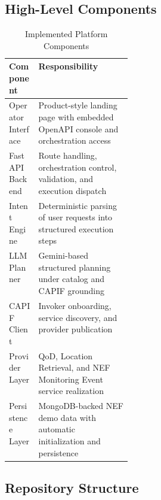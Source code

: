 \documentclass[conference]{IEEEtran}
\begin{document}
\subsection{High-Level Components}

\begin{table}[h]
\caption{Implemented Platform Components}
\label{tab:components}
\centering
\small
\begin{tabularx}{\linewidth}{>{\raggedright\arraybackslash}p{0.24\linewidth} X}
\toprule
\textbf{Component} & \textbf{Responsibility} \\
\midrule
Operator Interface & Product-style landing page with embedded OpenAPI console and orchestration access \\
FastAPI Backend & Route handling, orchestration control, validation, and execution dispatch \\
Intent Engine & Deterministic parsing of user requests into structured execution steps \\
LLM Planner & Gemini-based structured planning under catalog and CAPIF grounding \\
CAPIF Client & Invoker onboarding, service discovery, and provider publication \\
Provider Layer & QoD, Location Retrieval, and NEF Monitoring Event service realization \\
Persistence Layer & MongoDB-backed NEF demo data with automatic initialization and persistence \\
\bottomrule
\end{tabularx}
\end{table}

\subsection{Repository Structure}
\end{document}
